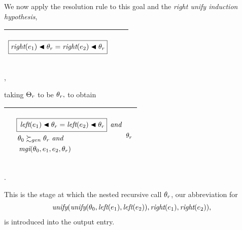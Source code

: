\documentclass[runningheads]{llncs}
\DeclareMathOperator{\uand}{\emph{and}\,}
\DeclareMathOperator{\unify}{\emph{unify}}
\DeclareMathOperator{\lef}{\emph{left}}
\DeclareMathOperator{\rig}{\emph{right}}
\DeclareMathOperator{\mgi}{\emph{mgi}}
\begin{document}
We now apply the resolution rule to this goal and the \emph{right unify induction hypothesis},
\begin{center}
  \begin{tabular}{|m{}|m{}||m{}|}
\hline
\begin{center}
$
\begin{aligned}
  \boxed{\begin{aligned}
    \rig(\e{1}) \apply \thet{r} = 
      \rig(\e{2}) \apply \thet{r} 
   \end{aligned}}
\end{aligned} 
$  \hspace{0cm} 
\end{center}& &  \\  \hline
\end{tabular},
\end{center}
taking  $\Theta_{r}$ to be $\theta_{r},$ to obtain
\begin{center}
\begin{tabular}{|m{}|m{}||m{}|}
 \hline 
  & 
   \begin{center}
{$\begin{aligned}
 &\begin{aligned}    
 &\boxed{
\begin{aligned}
    &\lef(\e{1}) \apply \thet{r} = 
      \lef(\e{2}) \apply \thet{r} \hspace{-10pt}\end{aligned}}
\end{aligned} \hspace{-7pt} \uand  \\
& \,\thet{0} \moregen \thet{r} \, \uand \\ & 
  \,  \,{\mgi}(\thet{0}, \e{1}, \e{2}, \thet{r})
\end{aligned}$}
\end{center}
& 

\begin{center}
$
\hspace{-10pt}
\begin{aligned}
\thet{r}
\end{aligned}
$
\end{center}
\\[10pt]
\hline
\end{tabular}.
\end{center}
 This is the stage at which the nested recursive call $\theta_{r}$, our abbreviation for 
\[\begin{aligned}
\unify(
\begin{aligned}
   \unify(\thet{0}, 
  \lef(\e{1}),  
 \lef(\e{2})),
   \end{aligned} 
\rig(\e{1}), 
\rig(\e{2}))
 \end{aligned}, \]
 is introduced into the output entry.
\end{document}
